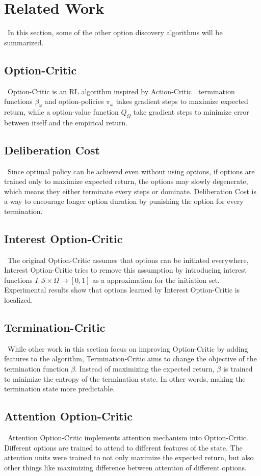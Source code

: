 \documentclass{article}
\begin{document}
	\section{Related Work}
	\qquad \ In this section, some of the other option discovery algorithms will be summarized.
	\subsection*{Option-Critic}
	\qquad \ Option-Critic \cite{bacon2016optioncritic} is an RL algorithm inspired by Action-Critic \cite{Konda00actor-criticalgorithms}. termination functions $\beta_\omega$ and option-policies $\pi_\omega$ takes gradient steps to maximize expected return, while a option-value function $Q_\Omega$ take gradient steps to minimize error between itself and the empirical return.
	\subsection*{Deliberation Cost}
	\qquad \ Since optimal policy can be achieved even without using options, if options are trained only to maximize expected return, the options may slowly degenerate, which means they either terminate every steps or dominate. Deliberation Cost \cite{harb2017waiting} is a way to encourage longer option duration by punishing the option for every termination.
	\subsection*{Interest Option-Critic}
	\qquad \ The original Option-Critic assumes that options can be initiated everywhere, Interest Option-Critic \cite{khetarpal2020options} tries to remove this assumption by introducing interest functions $I:\mathcal{S} \times \Omega \rightarrow [0,1]$ as a approximation for the initiation set. Experimental results show that options learned by Interest Option-Critic is localized.
	\subsection*{Termination-Critic}
	\qquad \ While other work in this section focus on improving Option-Critic by adding features to the algorithm, Termination-Critic \cite{harutyunyan2019termination} aims to change the objective of the termination function $\beta$. Instead of maximizing the expected return, $\beta$ is trained to minimize the entropy of the termination state. In other words, making the termination state more predictable.
	\subsection*{Attention Option-Critic}
	\qquad \ Attention Option-Critic \cite{attentionoptioncritic} implements attention mechanism into Option-Critic. Different options are trained to attend to different features of the state. The attention units were trained to not only maximize the expected return, but also other things like maximizing difference between attention of different options.
\end{document}
